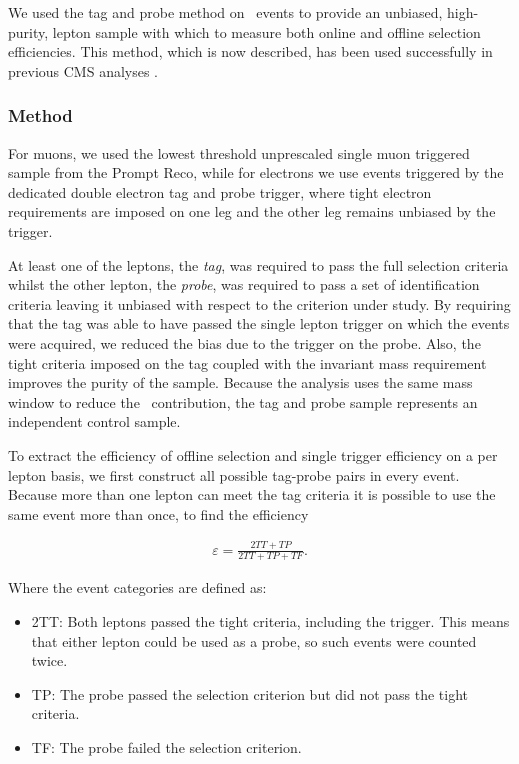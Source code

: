  
We used the tag and probe method on \dyll~events to provide an unbiased, high-purity, 
lepton sample with which to measure both online and offline selection efficiencies.
This method, which is now described, 
has been used successfully in previous CMS analyses \cite{ref:tagprobe_mit_w}\cite{ref:tagprobe_snt_top}.

\subsubsection{Method}
For muons, we used the lowest threshold unprescaled single muon triggered sample from the Prompt Reco,
while for electrons we use events triggered by the dedicated double electron tag and probe trigger,
where tight electron requirements are imposed on one leg and the other leg remains unbiased by the trigger.

At least one of the leptons, the {\it tag}, was required to pass the full selection criteria
whilst the other lepton, the {\it probe}, was required to pass a set of identification criteria leaving 
it unbiased with respect to the criterion under study. By requiring that the tag was able to have passed 
the single lepton trigger on which the events were acquired, we reduced the bias due to the trigger on 
the probe. Also, the tight criteria imposed on the tag coupled with the invariant mass requirement 
improves the purity of the sample. Because the analysis uses the same mass window to reduce the 
\dyll~contribution, the tag and probe sample represents an independent control sample.

To extract the efficiency of offline selection and single trigger efficiency on a per lepton basis, 
we first construct all possible tag-probe pairs in every event. Because more than one lepton can 
meet the tag criteria it is possible to use the same event more than once, to find the efficiency

\begin{eqnarray}
\label{eqn:tagAndProbeEfficiencyEqn}
\varepsilon = \frac{2TT + TP}{2TT + TP + TF}.
\end{eqnarray}

Where the event categories are defined as:

\begin{itemize}
	\item 2TT: Both leptons passed the tight criteria, including the trigger. This means that either lepton could be used as a probe, 
	so such events were counted twice.
	\item TP: The probe passed the selection criterion but did not pass the tight criteria.
	\item TF: The probe failed the selection criterion.
\end{itemize}

